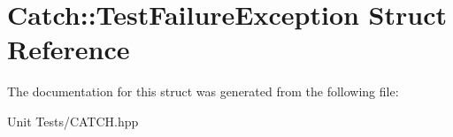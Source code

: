 \hypertarget{structCatch_1_1TestFailureException}{}\section{Catch\+:\+:Test\+Failure\+Exception Struct Reference}
\label{structCatch_1_1TestFailureException}


The documentation for this struct was generated from the following file\+:\begin{DoxyCompactItemize}
\item 
Unit Tests/C\+A\+T\+C\+H.\+hpp\end{DoxyCompactItemize}
